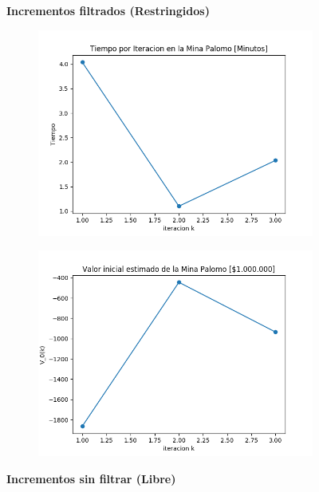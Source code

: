 \documentclass[12pt,letterpaper]{article}
\begin{document}
\begin{figure}[H]
  \textbf{Incrementos filtrados (Restringidos)}
  
  \begin{subfigure}[b]{0.4\textwidth}
     \includegraphics[width=\textwidth]{Graficos/Incrementos_filtrados/restringido/palomo25_inc_times.png}
     \caption{}
     \label{fig:ex1}
  \end{subfigure}
  \begin{subfigure}[b]{0.4\textwidth}
     \includegraphics[width=\textwidth]{Graficos/Incrementos_filtrados/restringido/palomo25_inc_v_k.png}
     \caption{}
     \label{fig:ex2}
  \end{subfigure}

  \textbf{Incrementos sin filtrar (Libre)}
  

\end{figure}
\end{document}
